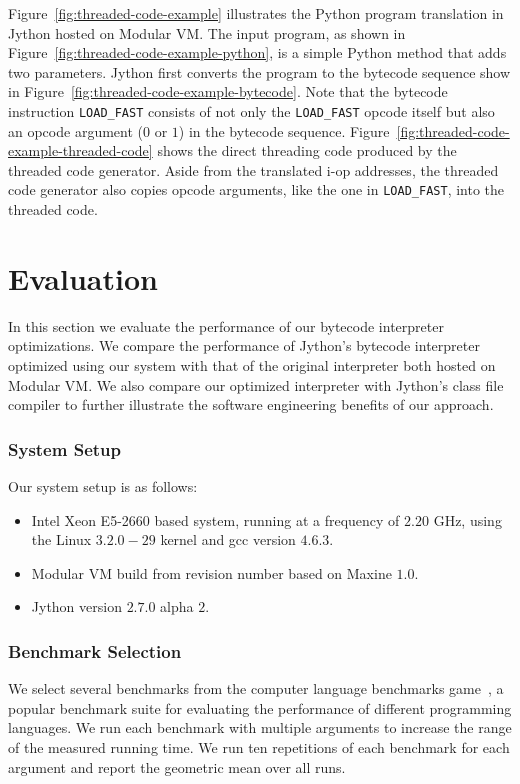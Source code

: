 Figure~\ref{fig:threaded-code-example} illustrates the Python program translation in Jython hosted on Modular VM.
The input program, as shown in Figure~\ref{fig:threaded-code-example-python}, is a simple Python method that adds two parameters.
Jython first converts the program to the bytecode sequence show in Figure~\ref{fig:threaded-code-example-bytecode}.
Note that the bytecode instruction \texttt{LOAD\_FAST} consists of not only the \texttt{LOAD\_FAST} opcode itself but also an opcode argument ($0$ or $1$) in the bytecode sequence.
Figure~\ref{fig:threaded-code-example-threaded-code} shows the direct threading code produced by the threaded code generator.
Aside from the translated i-op addresses, the threaded code generator also copies opcode arguments, like the one in \texttt{LOAD\_FAST}, into the threaded code.

\section{Evaluation}

In this section we evaluate the performance of our bytecode interpreter optimizations.
We compare the performance of Jython's bytecode interpreter optimized using our system with that of the original interpreter both hosted on Modular VM.
We also compare our optimized interpreter with Jython's class file compiler to further illustrate the software engineering benefits of our approach.

\subsubsection{System Setup}

Our system setup is as follows:
\begin{itemize}
  \item Intel Xeon E5-2660 based system, running at a frequency of $2.20$ GHz, using the Linux $3.2.0-29$ kernel and gcc version $4.6.3$.
  \item Modular VM build from revision number  based on Maxine $1.0$.
  \item Jython version $2.7.0$ alpha $2$.
\end{itemize}

\subsubsection{Benchmark Selection}

We select several benchmarks from the computer language benchmarks game~\cite{benchmarkgame}, a popular benchmark suite for evaluating the performance of different programming languages.
We run each benchmark with multiple arguments to increase the range of the measured running time.
We run ten repetitions of each benchmark for each argument and report the geometric mean over all runs.

